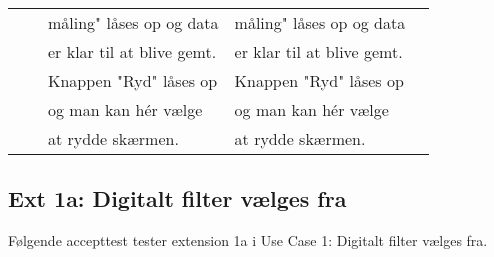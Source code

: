 \begin{table}[h!]
\begin{tabular}{lllll}
		\multicolumn{1}{l|}{} & \multicolumn{1}{l|}{} & \multicolumn{1}{l|}{måling" låses op og data} & \multicolumn{1}{l|}{måling" låses op og data} &  \\
		\multicolumn{1}{l|}{} & \multicolumn{1}{l|}{} & \multicolumn{1}{l|}{er klar til at blive gemt.} & \multicolumn{1}{l|}{er klar til at blive gemt.} &  \\
		\multicolumn{1}{l|}{} & \multicolumn{1}{l|}{} & \multicolumn{1}{l|}{Knappen "Ryd" låses op} & \multicolumn{1}{l|}{Knappen "Ryd" låses op} &  \\
		\multicolumn{1}{l|}{} & \multicolumn{1}{l|}{} & \multicolumn{1}{l|}{og man kan hér vælge} & \multicolumn{1}{l|}{og man kan hér vælge} &  \\
		\multicolumn{1}{l|}{} & \multicolumn{1}{l|}{} & \multicolumn{1}{l|}{at rydde skærmen.} & \multicolumn{1}{l|}{at rydde skærmen.} & 
	\end{tabular}
\end{table}
\vspace{0.3cm}
\subsection{Ext 1a: Digitalt filter vælges fra}
\vspace{0.3cm}
Følgende accepttest tester extension 1a i Use Case 1: Digitalt filter vælges fra.
\clearpage

